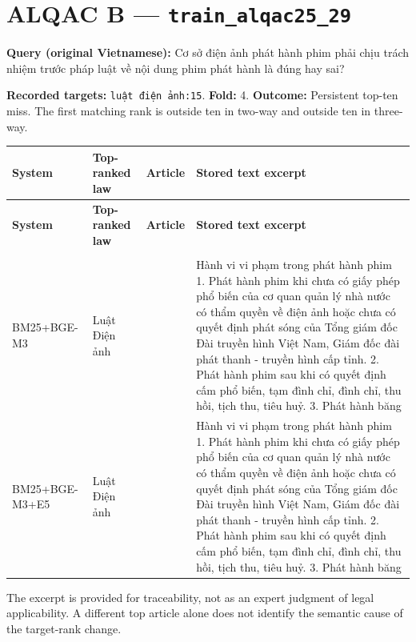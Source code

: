 \section{ALQAC B — \texttt{train\_al\allowbreak{}qac25\_29}}

\textbf{Query (original Vietnamese):} Cơ sở điện ảnh phát hành phim phải chịu trách nhiệm trước pháp luật về nội dung phim phát hành là đúng hay sai?

\textbf{Recorded targets:} \texttt{luật điệ\allowbreak{}n ảnh:15}. \textbf{Fold:} 4. \textbf{Outcome:} Persistent top-ten miss. The first matching rank is outside ten in two-way and outside ten in three-way.

\begingroup
\scriptsize
\setlength{\tabcolsep}{2pt}
\renewcommand{\arraystretch}{1.0}
\begin{longtable}{>{\raggedright\arraybackslash}p{2.022cm}>{\raggedright\arraybackslash}p{2.022cm}>{\raggedright\arraybackslash}p{1.891cm}>{\raggedright\arraybackslash}p{9.185cm}}
\toprule
\textbf{System} & \textbf{Top-ranked law} & \textbf{Article} & \textbf{Stored text excerpt} \\
\midrule
\endfirsthead
\toprule
\textbf{System} & \textbf{Top-ranked law} & \textbf{Article} & \textbf{Stored text excerpt} \\
\midrule
\endhead
\midrule
\multicolumn{4}{r}{\footnotesize Continued on next page}\\
\endfoot
\bottomrule
\endlastfoot
BM25+\allowbreak{}BGE-M3 & Luật Điện ảnh & 50 & Hành vi vi phạm trong phát hành phim    1. Phát hành phim khi chưa có giấy phép phổ biến của cơ quan quản lý nhà nước có thẩm quyền về điện ảnh hoặc chưa có quyết định phát sóng của Tổng giám đốc Đài truyền hình Việt Nam, Giám đốc đài phát thanh - truyền hình cấp tỉnh.    2. Phát hành phim sau khi có quyết định cấm phổ biến, tạm đình chỉ, đình chỉ, thu hồi, tịch thu, tiêu huỷ.    3. Phát hành băng \\
BM25+\allowbreak{}BGE-M3+\allowbreak{}E5 & Luật Điện ảnh & 50 & Hành vi vi phạm trong phát hành phim    1. Phát hành phim khi chưa có giấy phép phổ biến của cơ quan quản lý nhà nước có thẩm quyền về điện ảnh hoặc chưa có quyết định phát sóng của Tổng giám đốc Đài truyền hình Việt Nam, Giám đốc đài phát thanh - truyền hình cấp tỉnh.    2. Phát hành phim sau khi có quyết định cấm phổ biến, tạm đình chỉ, đình chỉ, thu hồi, tịch thu, tiêu huỷ.    3. Phát hành băng \\
\end{longtable}
\endgroup

The excerpt is provided for traceability, not as an expert judgment of legal applicability. A different top article alone does not identify the semantic cause of the target-rank change.


